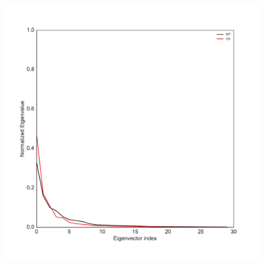\begin{figure}
\centering
	\includegraphics[height=0.5\textheight]{figures/eigenvals.pdf}
\end{figure}


